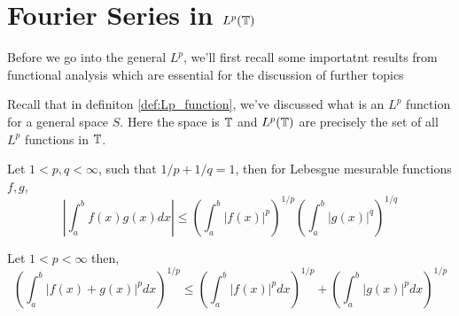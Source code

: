 \newpage
\section{Fourier Series in $L^p(\mathbb T)$}
Before we go into the general $L^p$, we'll first recall some importatnt results from functional analysis which are essential for the discussion of further topics

Recall that in definiton \ref{def:Lp_function}, we've discussed what is an $L^p$ function for a general space $S$. Here the space is $\mathbb T$ and $L^p(\mathbb T)$ are precisely the set of all $L^p$ functions in $\mathbb T$.

\begin{theorem}
  Let $1 < p, q < \infty$, such that $1/p + 1/q = 1$, then for Lebesgue mesurable functions $f, g$,
  $$ \left| \int_a^b f(x)g(x) dx \right| \le \left(\int_a^b |f(x)|^p \right)^{1/p} \left(\int_a^b |g(x)|^q \right)^{1/q}$$
\end{theorem}

\begin{theorem}
 Let $1 < p < \infty$ then, 
  $$\left(\int_a^b |f(x) + g(x)|^p dx \right)^{1/p} \le \left( \int_a^b |f(x)|^p dx \right)^{1/p} + \left( \int_a^b |g(x)|^p dx \right)^{1/p}$$
\end{theorem}
